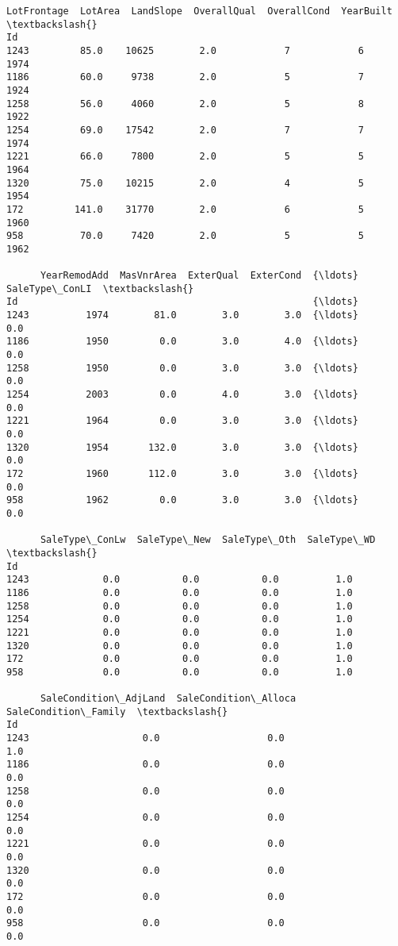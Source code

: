 \documentclass[11pt]{article}
\makeatletter
\newcommand{\boxspacing}{\kern\kvtcb@left@rule\kern\kvtcb@boxsep}
\newcommand{\prompt}[4]{
        {\ttfamily\llap{{\color{#2}[#3]:\hspace{3pt}#4}}\vspace{-\baselineskip}}
    }
\makeatother
\begin{document}
            \begin{tcolorbox}[breakable, size=fbox, boxrule=.5pt, pad at break*=1mm, opacityfill=0]
\prompt{Out}{outcolor}{16}{\boxspacing}
\begin{Verbatim}[commandchars=\\\{\}]
      LotFrontage  LotArea  LandSlope  OverallQual  OverallCond  YearBuilt  \textbackslash{}
Id
1243         85.0    10625        2.0            7            6       1974
1186         60.0     9738        2.0            5            7       1924
1258         56.0     4060        2.0            5            8       1922
1254         69.0    17542        2.0            7            7       1974
1221         66.0     7800        2.0            5            5       1964
1320         75.0    10215        2.0            4            5       1954
172         141.0    31770        2.0            6            5       1960
958          70.0     7420        2.0            5            5       1962

      YearRemodAdd  MasVnrArea  ExterQual  ExterCond  {\ldots}  SaleType\_ConLI  \textbackslash{}
Id                                                    {\ldots}
1243          1974        81.0        3.0        3.0  {\ldots}             0.0
1186          1950         0.0        3.0        4.0  {\ldots}             0.0
1258          1950         0.0        3.0        3.0  {\ldots}             0.0
1254          2003         0.0        4.0        3.0  {\ldots}             0.0
1221          1964         0.0        3.0        3.0  {\ldots}             0.0
1320          1954       132.0        3.0        3.0  {\ldots}             0.0
172           1960       112.0        3.0        3.0  {\ldots}             0.0
958           1962         0.0        3.0        3.0  {\ldots}             0.0

      SaleType\_ConLw  SaleType\_New  SaleType\_Oth  SaleType\_WD  \textbackslash{}
Id
1243             0.0           0.0           0.0          1.0
1186             0.0           0.0           0.0          1.0
1258             0.0           0.0           0.0          1.0
1254             0.0           0.0           0.0          1.0
1221             0.0           0.0           0.0          1.0
1320             0.0           0.0           0.0          1.0
172              0.0           0.0           0.0          1.0
958              0.0           0.0           0.0          1.0

      SaleCondition\_AdjLand  SaleCondition\_Alloca  SaleCondition\_Family  \textbackslash{}
Id
1243                    0.0                   0.0                   1.0
1186                    0.0                   0.0                   0.0
1258                    0.0                   0.0                   0.0
1254                    0.0                   0.0                   0.0
1221                    0.0                   0.0                   0.0
1320                    0.0                   0.0                   0.0
172                     0.0                   0.0                   0.0
958                     0.0                   0.0                   0.0


\end{Verbatim}
\end{tcolorbox}
\end{document}
